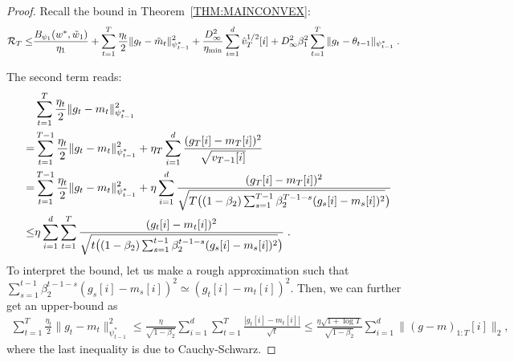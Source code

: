 \documentclass[wcp]{jmlr}
\begin{document}
\begin{proof}
Recall the bound in Theorem~\ref{THM:MAINCONVEX}:
\begin{equation}\notag
\begin{aligned}
\mathcal{R}_T \leq &   \frac{ B_{\psi_1}(w^*, \tilde{w}_{1})}{\eta_1}
+ \sum_{t=1}^T\frac{\eta_t}{2} \| g_t - \tilde{m}_t  \|_{\psi_{t-1}^*}^2  + \frac{D_{\infty}^2}{\eta_{\min}}  \sum_{i=1}^d \hat{v}_{T}^{1/2}[i] + D_{\infty}^2\beta_1^2   \sum_{t=1}^T  \| g_t - \theta_{t-1}  \|_{\psi_{t-1}^*}\eqsp.
\end{aligned}
\end{equation}

The second term reads:
\begin{align*}
     &\sum_{t=1}^T \frac{\eta_t}{2} \|g_t - m_t  \|_{\psi_{t-1}^*}^2 \\
      =&\sum_{t=1}^{T-1} \frac{\eta_t}{2} \|g_t - m_t  \|_{\psi_{t-1}^*}^2   + \eta_T \sum_{i=1}^d \frac{ (g_{T}[i] - m_{T}[i])^2 }{ \sqrt{ v_{T-1}[i]} }\\
=&\sum_{t=1}^{T-1} \frac{\eta_t}{2} \|g_t - m_t  \|_{\psi_{t-1}^*}^2 + \eta \sum_{i=1}^d \frac{ (g_{T}[i] - m_{T}[i])^2 }{ \sqrt{ T \big( (1-\beta_2) \sum_{s=1}^{T-1} \beta_2^{T-1-s} (g_{s}[i] - m_{s}[i])^2 } \big) }\\
\leq &  \eta \sum_{i=1}^d \sum_{t=1}^T \frac{ (g_{t}[i] - m_{t}[i])^2 }{ \sqrt{ t \big( (1-\beta_2) \sum_{s=1}^{t-1} \beta_2^{t-1-s} (g_{s}[i] - m_{s}[i])^2 } \big) } \eqsp.
\end{align*}
To interpret the bound, let us make a rough approximation such that
$\sum_{s=1}^{t-1} \beta_2^{t-1-s} (g_{s}[i] - m_{s}[i])^2  \simeq (g_{t}[i] - m_t[i])^2 $.
Then, we can further get an upper-bound as 
\begin{align*}
    \sum_{t=1}^T \frac{\eta_t}{2} \|g_t - m_t  \|_{\psi_{t-1}^*}^2 \leq
    \frac{\eta}{\sqrt{1 - \beta_2}} \sum_{i=1}^d \sum_{t=1}^{T} \frac{ | g_{t}[i] - m_{t}[i] | }{ \sqrt{t} }\leq \frac{\eta \sqrt{1 + \log T}}{\sqrt{1 - \beta_2}} \sum_{i=1}^d \| (g-m)_{1:T}[i] \|_2 ,
\end{align*}
where the last inequality is due to Cauchy-Schwarz.


\end{proof}

\vspace{0.2in}
\end{document}
